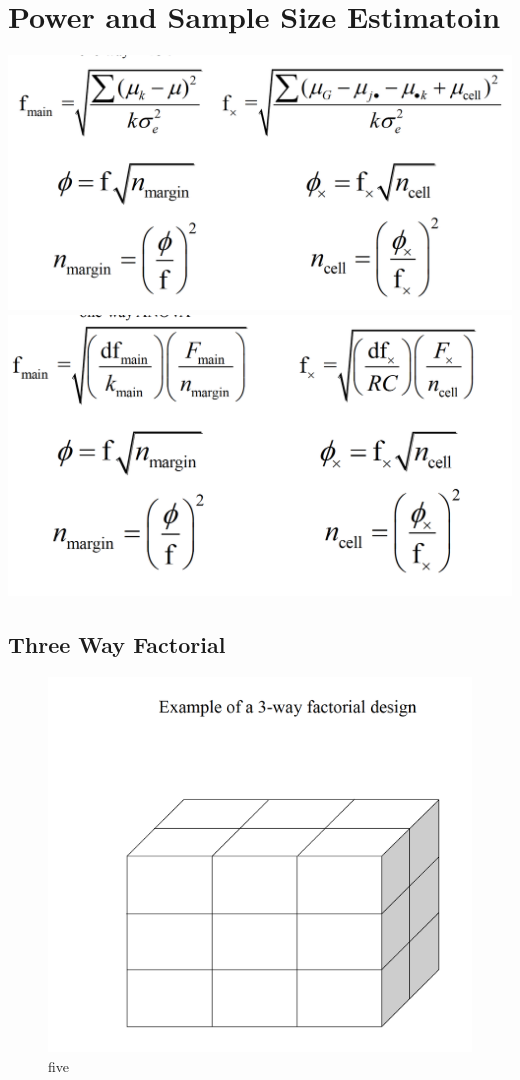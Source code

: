 \documentclass[]{book}
\theoremstyle{definition}
\theoremstyle{definition}
\theoremstyle{definition}
\theoremstyle{remark}
\begin{document}
\section{Power and Sample Size
Estimatoin}\label{power-and-sample-size-estimatoin}

\includegraphics{img/hicksfa24.png} \includegraphics{img/hicksfa25.png}

\subsection{Three Way Factorial}\label{three-way-factorial}

\begin{figure}
\centering
\includegraphics{img/hicksfa26.png}
\caption{five}
\end{figure}
\end{document}
